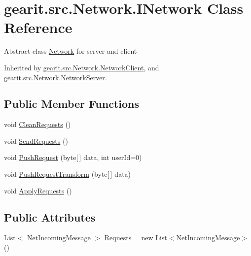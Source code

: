 \hypertarget{classgearit_1_1src_1_1_network_1_1_i_network}{\section{gearit.\+src.\+Network.\+I\+Network Class Reference}
\label{classgearit_1_1src_1_1_network_1_1_i_network}
}


Abstract class \hyperlink{namespacegearit_1_1src_1_1_network}{Network} for server and client  




Inherited by \hyperlink{classgearit_1_1src_1_1_network_1_1_network_client}{gearit.\+src.\+Network.\+Network\+Client}, and \hyperlink{classgearit_1_1src_1_1_network_1_1_network_server}{gearit.\+src.\+Network.\+Network\+Server}.

\subsection*{Public Member Functions}
\begin{DoxyCompactItemize}
\item 
void \hyperlink{classgearit_1_1src_1_1_network_1_1_i_network_a07a9db03d351717ff5e40458b147fbc6}{Clean\+Requests} ()
\item 
void \hyperlink{classgearit_1_1src_1_1_network_1_1_i_network_a11a53f0b7fb75b7e0661319c245745bf}{Send\+Requests} ()
\item 
void \hyperlink{classgearit_1_1src_1_1_network_1_1_i_network_a916413379181b54854fbbe23887fcd7b}{Push\+Request} (byte\mbox{[}$\,$\mbox{]} data, int user\+Id=0)
\item 
void \hyperlink{classgearit_1_1src_1_1_network_1_1_i_network_a8c4e1b77735f208840d328627bc8db25}{Push\+Request\+Transform} (byte\mbox{[}$\,$\mbox{]} data)
\item 
void \hyperlink{classgearit_1_1src_1_1_network_1_1_i_network_a32c2866c65eb362b0c51486ce07c3bba}{Apply\+Requests} ()
\end{DoxyCompactItemize}
\subsection*{Public Attributes}
\begin{DoxyCompactItemize}
\item 
List$<$ Net\+Incoming\+Message $>$ \hyperlink{classgearit_1_1src_1_1_network_1_1_i_network_a05731bbb209111cf1873385a14f0ad11}{Requests} = new List$<$Net\+Incoming\+Message$>$()
\end{DoxyCompactItemize}
